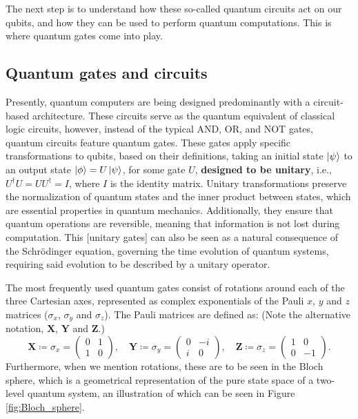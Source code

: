 The next step is to understand how these so-called quantum circuits act on our qubits, and how they can be used to perform quantum computations. This is where quantum gates come into play.




\subsection*{Quantum gates and circuits}
Presently, quantum computers are being designed predominantly with a circuit-based architecture. These circuits serve as the quantum equivalent of classical logic circuits, however, instead of the typical AND, OR, and NOT gates, quantum circuits feature quantum gates. These gates apply specific transformations to qubits, based on their definitions, taking an initial state $\ket{\psi}$ to an output state $\ket{\phi} = U\ket{\psi}$, for some gate $U$, \textbf{designed to be unitary}, i.e., $U^{\dagger}U = UU^{\dagger} = I$, where $I$ is the identity matrix. Unitary transformations preserve the normalization of quantum states and the inner product between states, which are essential properties in quantum mechanics. Additionally, they ensure that quantum operations are reversible, meaning that information is not lost during computation. This [unitary gates] can also be seen as a natural consequence of the Schrödinger equation, governing the time evolution of quantum systems, requiring said evolution to be described by a unitary operator.

The most frequently used quantum gates consist of rotations around each of the three Cartesian axes, represented as complex exponentials of the Pauli $x$, $y$ and $z$ matrices ($\sigma_x$, $\sigma_y$ and $\sigma_z$). The Pauli matrices are defined as: (Note the alternative notation, $\boldsymbol{X}$, $\boldsymbol{Y}$ and $\boldsymbol{Z}$.)
\begin{equation}
  \boldsymbol{X} \coloneq \sigma_x =
  \begin{pmatrix}
    0 & 1 \\
    1 & 0
  \end{pmatrix},
  \quad
  \boldsymbol{Y} \coloneq \sigma_y =
  \begin{pmatrix}
    0 & -i \\
    i & 0
  \end{pmatrix},
  \quad
  \boldsymbol{Z} \coloneq \sigma_z =
  \begin{pmatrix}
    1 & 0 \\
    0 & -1
  \end{pmatrix}.
\end{equation}
Furthermore, when we mention rotations, these are to be seen in the Bloch sphere, which is a geometrical representation of the pure state space of a two-level quantum system, an illustration of which can be seen in Figure \ref{fig:Bloch_sphere}.

